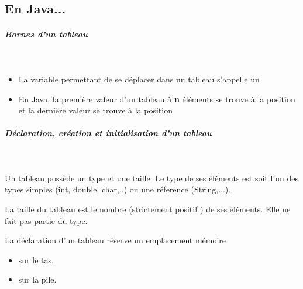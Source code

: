 \documentclass[11pt,a4paper]{article}
\begin{document}
        \subsection{En Java...}
			
		\subparagraph{Bornes d'un tableau} 
		
                \textcolor{white}{.} \par
            
					\begin{itemize}
				
			\item 
									La variable permettant de se d\'eplacer dans un tableau s'appelle un  \textcolor{gray}{\underline{\hspace*{5em}}} 
			\item 
									En Java, la premi\`ere valeur d'un tableau \`a \textbf{n} \'el\'ements se trouve \`a la position            
									 \textcolor{gray}{\underline{\hspace*{1em}}}  
									et la derni\`ere valeur se trouve \`a la position 
									 \textcolor{gray}{\underline{\hspace*{2em}}} 
					\end{itemize}
				
			
		\subparagraph{D\'eclaration, cr\'eation et initialisation d'un tableau } 
		
					\textcolor{white}{.} \par
				
            \par
        
					Un tableau poss\`ede un type et une taille.
					Le type de ses \'el\'ements est soit l'un des types simples (int, double, char,..) ou une r\'eference (String,...).
				
            \par
        
					La taille du tableau est le nombre (strictement positif ) de ses \'el\'ements.
					Elle ne fait pas partie du type.  
				
            \par
        La d\'eclaration d'un tableau r\'eserve un emplacement m\'emoire
            \begin{itemize} 
        
            \item[ \ding{"6D} ] sur le tas.
        
            \item[ \ding{"6D} ] sur la pile.
        
            \end{itemize} 
        
\end{document}
